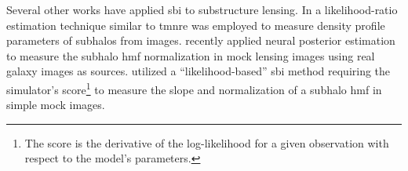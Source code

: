 Several other works have applied \gls*{sbi} to substructure lensing. In \cite{Zhang:2022djp} a likelihood-ratio estimation technique similar to \gls*{tmnre} was employed to measure density profile parameters of subhalos from images. \cite{Wagner-Carena:2022mrn} recently applied neural posterior estimation to measure the subhalo \gls*{hmf} normalization in mock lensing images using real galaxy images as sources. \cite{Brehmer:2019jyt} utilized a ``likelihood-based'' \gls*{sbi} method requiring the simulator's score\footnote{
    The score is the derivative of the log-likelihood for a given observation with respect to the model's parameters.
} to measure the slope and normalization of a subhalo \gls*{hmf} in simple mock images.

